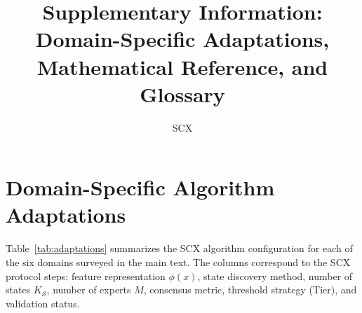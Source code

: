 \documentclass{article}
\begin{document}
\title{Supplementary Information: \\ Domain-Specific Adaptations, Mathematical Reference, and Glossary}

\author{SCX}

\maketitle

\tableofcontents

\newpage

\section{Domain-Specific Algorithm Adaptations}
\label{sec:adaptations}

Table~\ref{tab:adaptations} summarizes the SCX algorithm configuration for each of the six domains surveyed in the main text. The columns correspond to the SCX protocol steps: feature representation $\phi(x)$, state discovery method, number of states $K_{\mathcal{S}}$, number of experts $M$, consensus metric, threshold strategy (Tier), and validation status.
\end{document}
